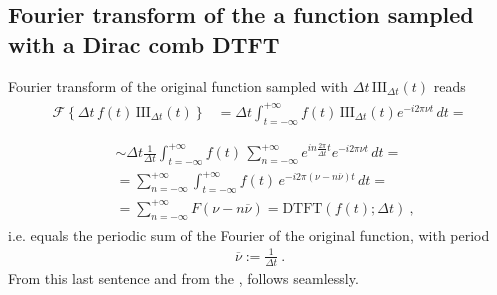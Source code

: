 \documentclass[letterpaper,10pt,english]{jupyterBook}
\begin{document}
\subsection{Fourier transform of the a function sampled with a Dirac comb \sphinxhyphen{} DTFT}
\label{\detokenize{ch/complex/fourier-transforms:fourier-transform-of-the-a-function-sampled-with-a-dirac-comb-dtft}}\label{\detokenize{ch/complex/fourier-transforms:complex-fourier-dtft}}
\sphinxAtStartPar
Fourier transform of the original function sampled with \(\Delta t \, \text{III}_{\Delta t}(t)\) reads
\begin{equation*}
\begin{split}\begin{aligned}
\mathscr{F}\left\{ \Delta t \, f(t) \, \text{III}_{\Delta t}(t) \right\}
 & = \Delta t \int_{t=-\infty}^{+\infty} f(t) \, \text{III}_{\Delta t}(t) e^{-i 2 \pi \nu t} \, dt =  \\
\end{aligned}\end{split}
\end{equation*}\begin{equation}\label{equation:ch/complex/fourier-transforms:eq:dtft:1}
\begin{split}\begin{aligned}
 & \sim \Delta t \frac{1}{\Delta t} \int_{t=-\infty}^{+\infty} f(t) \, \sum_{n=-\infty}^{+\infty} e^{i n \frac{2 \pi}{\Delta t} t} e^{-i 2 \pi \nu t} \, dt =  \\
 & = \sum_{n=-\infty}^{+\infty}  \int_{t=-\infty}^{+\infty} f(t) \, e^{-i 2 \pi \left( \nu - n \overline{\nu} \right) t} \, dt =  \\
 & = \sum_{n=-\infty}^{+\infty} F\left(\nu - n \overline{\nu} \right) = \text{DTFT}(f(t); \Delta t) \ ,
\end{aligned}\end{split}
\end{equation}
\sphinxAtStartPar
i.e. equals the periodic sum of the Fourier of the original function, with period
\begin{equation*}
\begin{split}\overline{\nu} := \frac{1}{\Delta t} \ .\end{split}
\end{equation*}
\sphinxAtStartPar
From this last sentence and from the {\hyperref[\detokenize{ch/complex/fourier-transforms:complex-fourier-useful-properties-symmetry}]{}},  follows seamlessly.
\end{document}
